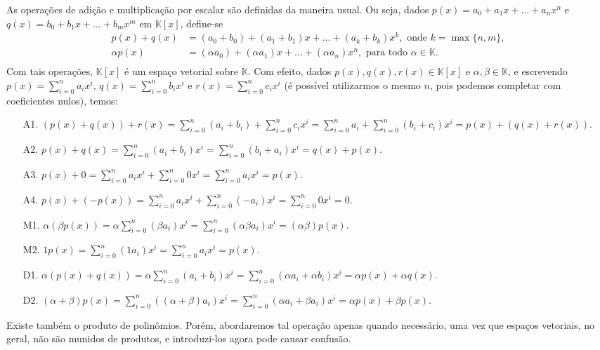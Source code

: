 \begin{example}
    As operações de adição e multiplicação por escalar são definidas da maneira usual.
    Ou seja, dados $p(x) = a_0 + a_1 x + \dots + a_n x^n$ e $q(x) = b_0 + b_1 x + \dots + b_m x^m$ em $\mathbb K[x]$, define-se
    \begin{align*}
        p(x) + q(x) &= (a_0 + b_0) + (a_1 + b_1)x + \dots + (a_k + b_k)x^k, \text{ onde } k = \max\{n, m\},\\
        \alpha p(x) &= (\alpha a_0) + (\alpha a_1)x + \dots + (\alpha a_n)x^n, \text{ para todo } \alpha \in \mathbb K.\\
    \end{align*}
    Com tais operações, $\mathbb K[x]$ é um espaço vetorial sobre $\mathbb K$.
    Com efeito, dados $p(x), q(x), r(x) \in \mathbb K[x]$ e $\alpha, \beta \in \mathbb K$, e escrevendo $p(x)= \sum_{i=0}^n a_i x^i$, $q(x)= \sum_{i=0}^n b_i x^i$ e $r(x)= \sum_{i=0}^n c_i x^i$ (é possível utilizarmos o mesmo $n$, pois podemos completar com coeficientes nulos), temos:
    \begin{itemize}
        \item[A1.] $(p(x) + q(x)) + r(x) = \sum_{i=0}^n (a_i + b_i) + \sum_{i=0}^n c_i x^i = \sum_{i=0}^n a_i + \sum_{i=0}^n (b_i + c_i)x^i = p(x) + (q(x) + r(x))$.
        \item[A2.] $p(x) + q(x) = \sum_{i=0}^n (a_i + b_i)x^i = \sum_{i=0}^n (b_i + a_i)x^i = q(x) + p(x)$.
        \item[A3.] $p(x) + 0 = \sum_{i=0}^n a_i x^i + \sum_{i=0}^n 0 x^i = \sum_{i=0}^n a_i x^i = p(x)$.
        \item[A4.] $p(x) + (-p(x)) = \sum_{i=0}^n a_i x^i + \sum_{i=0}^n (-a_i)x^i = \sum_{i=0}^n 0 x^i = 0$.
        \item[M1.] $\alpha(\beta p(x)) = \alpha \sum_{i=0}^n (\beta a_i)x^i = \sum_{i=0}^n (\alpha \beta a_i)x^i = (\alpha \beta)p(x)$.
        \item[M2.] $1 p(x) = \sum_{i=0}^n (1 a_i)x^i = \sum_{i=0}^n a_i x^i = p(x)$.
        \item[D1.] $\alpha(p(x) + q(x)) = \alpha \sum_{i=0}^n (a_i + b_i)x^i = \sum_{i=0}^n (\alpha a_i + \alpha b_i)x^i = \alpha p(x) + \alpha q(x)$.
        \item[D2.] $(\alpha + \beta)p(x) = \sum_{i=0}^n ((\alpha + \beta)a_i)x^i = \sum_{i=0}^n (\alpha a_i + \beta a_i)x^i = \alpha p(x) + \beta p(x)$.
    \end{itemize}

    Existe também o produto de polinômios.
    Porém, abordaremos tal operação apenas quando necessário, uma vez que espaços vetoriais, no geral, não são munidos de produtos, e introduzi-los agora pode causar confusão.
\end{example}

